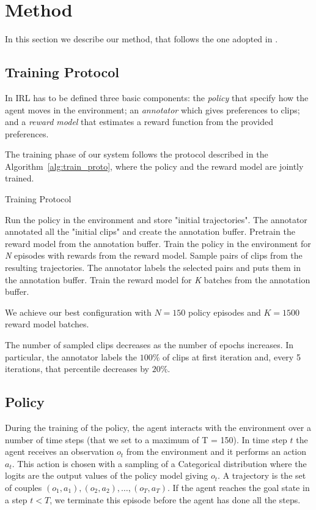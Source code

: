 \section{Method}\label{method}

In this section we describe our method, that follows the one adopted in \cite{NIPS2018_8025}.

\subsection{Training Protocol}\label{Alg}
In IRL has to be defined three basic components: the \textit{policy} that specify how the agent moves in the environment; an \textit{annotator} which gives preferences to clips; and a \textit{reward model} that estimates a reward function from the provided preferences. 

The training phase of our system follows the protocol described in the Algorithm\ \ref{alg:train_proto}, where the policy and the reward model are jointly trained.

\begin{algorithm}
\caption{Training Protocol}
\label{alg:train_proto}
\SetAlgoLined
\begin{algorithmic}[1]
\STATE Run the policy in the environment and store "initial trajectories".
\STATE The annotator annotated all the "initial clips" and create the annotation buffer.
\STATE Pretrain the reward model from the annotation buffer.
\STATE Train the policy in the environment for \textit{N} episodes with rewards from the reward model.
\STATE Sample pairs of clips from the resulting trajectories.
\STATE The annotator labels the selected pairs and puts them in the annotation buffer.
\STATE Train the reward model for \textit{K} batches from the annotation buffer.
\ENDFOR 
\end{algorithmic}
\end{algorithm}
 
We achieve our best configuration with $N=150$ policy episodes and $K=1500$ reward model batches. %

The number of sampled clips decreases as the number of epochs increases. In particular, the annotator labels the $100\%$ of clips at first iteration and, every 5 iterations, that percentile decreases by $20\%$. 
\subsection{Policy}
During the training of the policy, the agent interacts with the environment over a number of time steps (that we set to a maximum of T = 150). In time step $t$ the agent receives an observation $o_t$ from the environment and it performs an action $a_t$. This action is chosen with a sampling of a Categorical distribution where the logits are the output values of the policy model giving $o_t$. A trajectory is the set of couples ${(o_1, a_1), (o_2, a_2), \ldots, (o_T, a_T)}$. If the agent reaches the goal state in a step $\textit{t}<T$, we terminate this episode before the agent has done all the steps.

